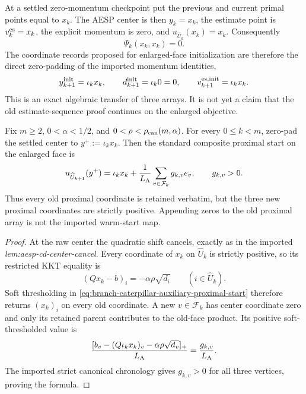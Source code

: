 At a settled zero-momentum checkpoint put the previous and current primal
points equal to $x_k$.  The AESP center is then $y_k=x_k$, the estimate point
is $v_k^{\rm es}=x_k$, the explicit momentum is zero, and
$u_{\widehat U_k}(x_k)=x_k$.  Consequently
\begin{equation}
 \Psi_k(x_k,x_k)=0.
 \label{eq:branch-caterpillar-old-zero-estimate}
\end{equation}
The coordinate records proposed for enlarged-face initialization are therefore
the direct zero-padding of the imported momentum identities,
\begin{equation}
 y_{k+1}^{\rm init}=\iota_kx_k,
 \qquad
 d_{k+1}^{\rm init}=\iota_k0=0,
 \qquad
 v_{k+1}^{{\rm es},{\rm init}}=\iota_kx_k.
 \label{eq:branch-caterpillar-settled-auxiliary-state-append}
\end{equation}
This is an exact algebraic transfer of three arrays.  It is not yet a claim
that the old estimate-sequence proof continues on the enlarged objective.

\begin{lemma}
\label{lem:branch-caterpillar-settled-proximal-append}
Fix $m\geq2$, $0<\alpha<1/2$, and
$0<\rho<\rho_{\rm can}(m,\alpha)$.  For every $0\leq k<m$, zero-pad the
settled center to $y^+:=\iota_kx_k$.  Then the standard composite proximal
start on the enlarged face is
\begin{equation}
 u_{\widehat U_{k+1}}(y^+)
 =\iota_kx_k+
   \frac1{L_{\rm A}}\sum_{v\in\mathcal F_k}g_{k,v}e_v,
 \qquad g_{k,v}>0.
 \label{eq:branch-caterpillar-settled-proximal-append}
\end{equation}
Thus every old proximal coordinate is retained verbatim, but the three new
proximal coordinates are strictly positive.  Appending zeros to the old
proximal array is not the imported warm-start map.
\end{lemma}

\begin{proof}
At the raw center the quadratic shift cancels, exactly as in the imported
\emph{lem:aesp-cd-center-cancel}.  Every coordinate of $x_k$ on
$\widehat U_k$ is strictly positive, so its restricted KKT equality is
\[
 (Qx_k-b)_i=-\alpha\rho\sqrt{d_i}
 \qquad(i\in\widehat U_k).
\]
Soft thresholding in
\cref{eq:branch-caterpillar-auxiliary-proximal-start} therefore returns
$(x_k)_i$ on every old coordinate.  A new $v\in\mathcal F_k$ has center
coordinate zero and only its retained parent contributes to the old-face
product.  Its positive soft-thresholded value is
\[
 \frac{[b_v-(Q\iota_kx_k)_v-\alpha\rho\sqrt{d_v}]_+}
      {L_{\rm A}}
 =\frac{g_{k,v}}{L_{\rm A}}.
\]
The imported strict canonical chronology gives $g_{k,v}>0$ for all three
vertices, proving the formula.
\end{proof}

